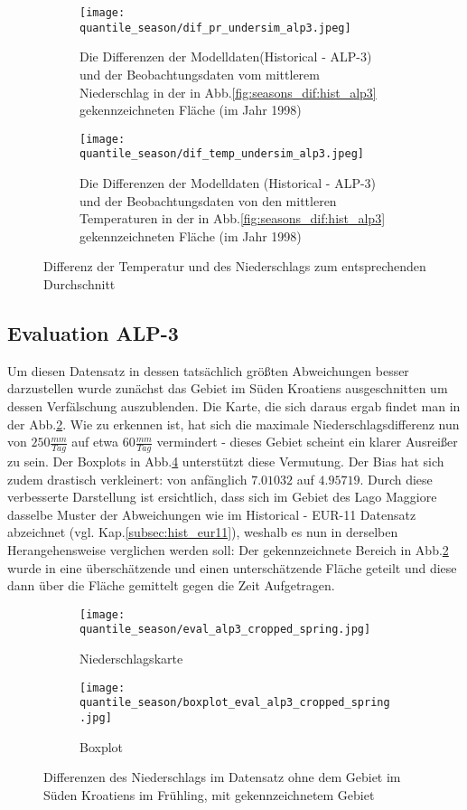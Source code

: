 \begin{figure}
	\begin{subfigure}{0.49\textwidth}
		\texttt{[image: quantile\_season/dif\_pr\_undersim\_alp3.jpeg]}
		\caption{Die Differenzen der Modelldaten(Historical - ALP-3) und der Beobachtungsdaten vom mittlerem Niederschlag in der in Abb.\ref{fig:seasons_dif:hist_alp3} gekennzeichneten Fläche (im Jahr 1998)}
	\end{subfigure}
	\begin{subfigure}{0.49\textwidth}
		\texttt{[image: quantile\_season/dif\_temp\_undersim\_alp3.jpeg]}
		\caption{Die Differenzen der Modelldaten (Historical - ALP-3) und der Beobachtungsdaten von den mittleren Temperaturen in der in Abb.\ref{fig:seasons_dif:hist_alp3} gekennzeichneten Fläche (im Jahr 1998)}
	\end{subfigure}
	\caption{Differenz der Temperatur und des Niederschlags zum entsprechenden Durchschnitt}
	\label{fig:seasons:mean_alp3}
\end{figure}

\subsection{Evaluation ALP-3}
Um diesen Datensatz in dessen tatsächlich größten Abweichungen besser darzustellen wurde zunächst das Gebiet im Süden Kroatiens ausgeschnitten um dessen Verfälschung auszublenden. Die Karte, die sich daraus ergab findet man in der Abb.\ref{fig:seasons:cropped eval_alp_3}. Wie zu erkennen ist, hat sich die maximale Niederschlagsdifferenz nun von $250\frac{mm}{Tag}$ auf etwa $60\frac{mm}{Tag}$ vermindert - dieses Gebiet scheint ein klarer Ausreißer zu sein. Der Boxplots in Abb.\ref{fig:seasons:cropped eval_alp_3_boxplot} unterstützt diese Vermutung. Der Bias hat sich zudem drastisch verkleinert: von anfänglich $7.01032$ auf $4.95719$. Durch diese verbesserte Darstellung ist ersichtlich, dass sich im Gebiet des Lago Maggiore dasselbe Muster der Abweichungen wie im Historical - EUR-11 Datensatz abzeichnet (vgl. Kap.\ref{subsec:hist_eur11}), weshalb es nun in derselben Herangehensweise verglichen werden soll: Der gekennzeichnete Bereich in Abb.\ref{fig:seasons:cropped eval_alp_3} wurde in eine überschätzende und einen unterschätzende Fläche geteilt und diese dann über die Fläche gemittelt gegen die Zeit Aufgetragen.
\begin{figure}[h]
	\begin{subfigure}{0.49\textwidth}
		\texttt{[image: quantile\_season/eval\_alp3\_cropped\_spring.jpg]}
		\caption{Niederschlagskarte}
		\label{fig:seasons:cropped eval_alp_3}
	\end{subfigure}
	\begin{subfigure}{0.49\textwidth}
		\texttt{[image: quantile\_season/boxplot\_eval\_alp3\_cropped\_spring.jpg]}
		\caption{Boxplot}
		\label{fig:seasons:cropped eval_alp_3_boxplot}
	\end{subfigure}
	\caption{Differenzen des Niederschlags im Datensatz ohne dem Gebiet im Süden Kroatiens im Frühling, mit gekennzeichnetem Gebiet}
\end{figure}

